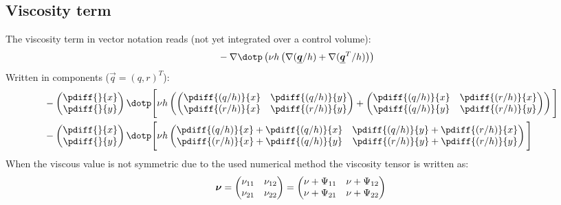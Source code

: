 \subsection{Viscosity term} \label{sec:viscosity_term_curvilinear}
The viscosity term in vector notation reads (not yet integrated over a control volume):
\begin{align}
    &-\nabla \dotp \left( \nu h \left(  \nabla (\vec{q}/h) + \nabla (\vec{q}^T/h) \right) \right)
\end{align}
Written in components ($\vec{q} = (q, r)^T$):
\begin{align}
    &
    - %
    \begin{pmatrix}
        \pdiff{}{x} \\
        \pdiff{}{y}
    \end{pmatrix}
    \dotp
    \Bigg[
    \nu h
    \left(
    \begin{pmatrix}
        \pdiff{(q/h)}{x} & \pdiff{(q/h)}{y}
        \\
        \pdiff{(r/h)}{x} & \pdiff{(r/h)}{y}
    \end{pmatrix}
    +
    \begin{pmatrix}
        \pdiff{(q/h)}{x} & \pdiff{(r/h)}{x}
        \\
        \pdiff{(q/h)}{y} & \pdiff{(r/h)}{y}
    \end{pmatrix}
    \right) \Bigg]
    \\
    &
    - %
\begin{pmatrix}
    \pdiff{}{x} \\
    \pdiff{}{y}
\end{pmatrix}
\dotp
\Bigg[
\nu h
\begin{pmatrix}
    \pdiff{(q/h)}{x} + \pdiff{(q/h)}{x} & \pdiff{(q/h)}{y} + \pdiff{(r/h)}{x}
    \\
    \pdiff{(r/h)}{x} + \pdiff{(q/h)}{y} & \pdiff{(r/h)}{y} + \pdiff{(r/h)}{y}
\end{pmatrix}
\Bigg]
\end{align}
When the viscous value is not symmetric due to the used numerical method
the viscosity tensor is written as:
%
\begin{align}
    \mbox{\boldmath ${\mathrm{\nu}}$} =
    \begin{pmatrix}
        \nu_{11} & \nu_{12} \\
        \nu_{21}  & \nu_{22}
    \end{pmatrix}=
    \begin{pmatrix}
        \nu + \Psi_{11} & \nu + \Psi_{12} \\
        \nu + \Psi_{21}  & \nu + \Psi_{22}
    \end{pmatrix}
\end{align}
